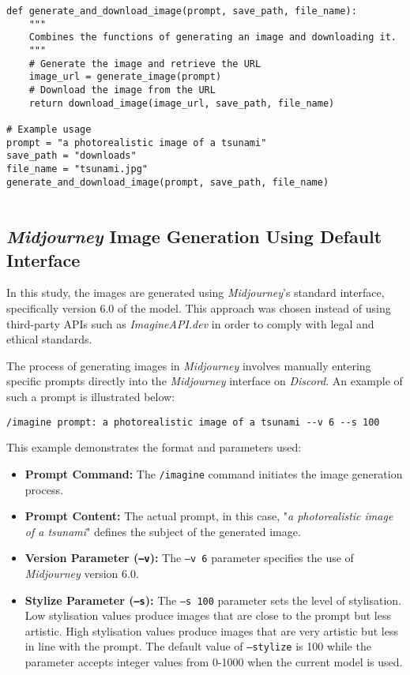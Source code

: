 \begin{lstlisting}
def generate_and_download_image(prompt, save_path, file_name):
    """
    Combines the functions of generating an image and downloading it.
    """
    # Generate the image and retrieve the URL
    image_url = generate_image(prompt)
    # Download the image from the URL
    return download_image(image_url, save_path, file_name)

# Example usage
prompt = "a photorealistic image of a tsunami"
save_path = "downloads"
file_name = "tsunami.jpg"
generate_and_download_image(prompt, save_path, file_name)


\end{lstlisting}

\subsection{\textit{Midjourney} Image Generation Using Default Interface}
\label{subsec:midjourney-default-interface}

In this study, the images are generated using \textit{Midjourney}'s standard interface, specifically version 6.0 of the model. This approach was chosen instead of using third-party APIs such as \textit{ImagineAPI.dev} in order to comply with legal and ethical standards.

The process of generating images in \textit{Midjourney} involves manually entering specific prompts directly into the \textit{Midjourney} interface on \textit{Discord}. An example of such a prompt is illustrated below:
\begin{verbatim}
/imagine prompt: a photorealistic image of a tsunami --v 6 --s 100
\end{verbatim}
This example demonstrates the format and parameters used:

\begin{itemize}
\item \textbf{Prompt Command:} The \texttt{/imagine} command initiates the image generation process.
\item \textbf{Prompt Content:} The actual prompt, in this case, "\textit{a photorealistic image of a tsunami}" defines the subject of the generated image.
\item \textbf{Version Parameter (\texttt{--v}):} The \texttt{--v 6} parameter specifies the use of \textit{Midjourney} version 6.0.
\item \textbf{Stylize Parameter (\texttt{--s}):} The \texttt{--s 100} parameter sets the level of stylisation. Low stylisation values produce images that are close to the prompt but less artistic. High stylisation values produce images that are very artistic but less in line with the prompt.  The default value of \texttt{--stylize} is 100 while the parameter accepts integer values from 0-1000 when the current model is used.
\end{itemize}

